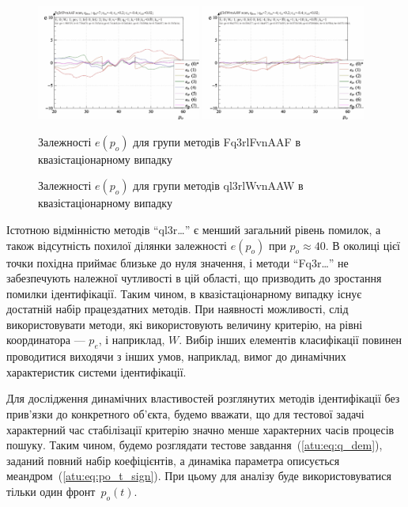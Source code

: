 \documentclass[a4paper,13pt]{atuaref}
\begin{document}
\begin{figure}[htb!]
    \includegraphics[width=0.48\textwidth]{p3/p/scan/qls-p_p_e_Fq3rlFvnAAF_scan.png} \hfill
    \includegraphics[width=0.48\textwidth]{p3/p/scan/qls-p_p_e_ql3rlWvnAAW_scan.png}
  \\
  \parbox[t]{0.48\textwidth} {
    \caption{Залежності $ e (p_o) $ для групи методів Fq3rlFvnAAF в квазістаціонарному випадку}
    \label{atu:f:Fq3rlFvnAAF_scan}
  } \hfill
  \parbox[t]{0.48\textwidth} {
    \caption{Залежності $ e (p_o) $ для групи методів ql3rlWvnAAW в квазістаціонарному випадку}
    \label{atu:f:ql3rlWvnAAW_scan}
  }
\end{figure}

Істотною відмінністю методів ``ql3r\ldots'' є менший загальний рівень
помилок, а також відсутність похилої ділянки залежності $ e (p_o) $ при
$ p_o \approx 40 $. В околиці цієї точки похідна приймає близьке до нуля значення, і
методи ``Fq3r\ldots'' не забезпечують належної чутливості в цій області, що
призводить до зростання помилки ідентифікації.
Таким чином, в квазістаціонарному випадку існує достатній набір працездатних
методів. При наявності можливості, слід використовувати методи, які
використовують величину критерію, на рівні координатора --- $ p_e $, і
наприклад, $ W $. Вибір інших елементів класифікації повинен проводитися
виходячи з інших умов, наприклад, вимог до динамічних характеристик системи
ідентифікації.

Для дослідження динамічних властивостей розглянутих методів ідентифікації без
прив'язки до конкретного об'єкта, будемо вважати, що для тестової задачі
характерний час стабілізації критерію значно менше характерних часів процесів
пошуку.
Таким чином, будемо розглядати тестове завдання~(\ref{atu:eq:q_dem}),
заданий повний набір коефіцієнтів, а динаміка параметра описується меандром~(\ref{atu:eq:po_t_sign}).
При цьому для аналізу буде використовуватися тільки один фронт~$p_o(t)$.
\end{document}
